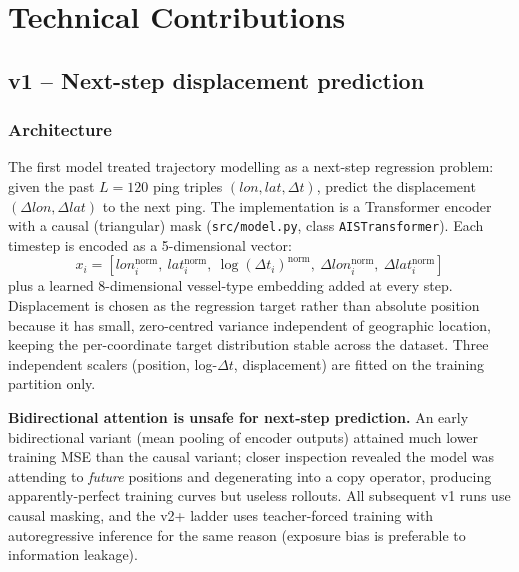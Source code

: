\documentclass[11pt,a4paper]{article}
\begin{document}
\section{Technical Contributions}
\label{sec:contributions}

\subsection{v1 -- Next-step displacement prediction}
\label{sec:v1}

\subsubsection{Architecture}

The first model treated trajectory modelling as a next-step regression problem:
given the past $L=120$ ping triples $(lon, lat, \Delta t)$, predict the
displacement $(\Delta lon, \Delta lat)$ to the next ping.
The implementation is a Transformer encoder with a causal (triangular) mask
(\texttt{src/model.py}, class \texttt{AISTransformer}).
Each timestep is encoded as a 5-dimensional vector:
\[
  x_i = [lon_i^\text{norm},\ lat_i^\text{norm},\ \log(\Delta t_i)^\text{norm},
          \ \Delta lon_i^\text{norm},\ \Delta lat_i^\text{norm}]
\]
plus a learned 8-dimensional vessel-type embedding added at every step.
Displacement is chosen as the regression target rather than absolute position
because it has small, zero-centred variance independent of geographic location,
keeping the per-coordinate target distribution stable across the dataset.
Three independent scalers (position, log-$\Delta t$, displacement) are fitted on
the training partition only.

\textbf{Bidirectional attention is unsafe for next-step prediction.}
An early bidirectional variant (mean pooling of encoder outputs) attained
much lower training MSE than the causal variant; closer inspection revealed
the model was attending to \emph{future} positions and degenerating into a
copy operator, producing apparently-perfect training curves but useless
rollouts.  All subsequent v1 runs use causal masking, and the v2+ ladder uses
teacher-forced training with autoregressive inference for the same reason
(exposure bias is preferable to information leakage).
\end{document}
